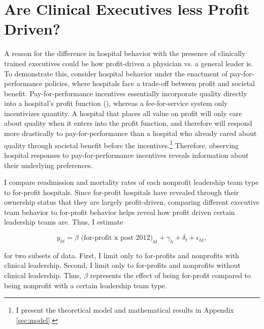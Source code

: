 \documentclass[12pt]{article}
\begin{document}
\begin{figure}
\begin{subfigure}[b]{0.45\textwidth}
         \label{fig:mort_synth_clinical}
     \end{subfigure}
        \label{fig:clinicalsynthdid}
    \end{figure}


    \section{Are Clinical Executives less Profit Driven?}\label{sec:forprofit}

    A reason for the difference in hospital behavior with the presence of clinically trained executives could be how profit-driven a physician vs. a general leader is. To demonstrate this, consider hospital behavior under the enactment of pay-for-performance policies, where hospitals face a trade-off between profit and societal benefit. Pay-for-performance incentives essentially incorporate quality directly into a hospital's profit function (\cite{dranove2011health}), whereas a fee-for-service system only incentivizes quantity. A hospital that places all value on profit will only care about quality when it enters into the profit function, and therefore will respond more drastically to pay-for-performance than a hospital who already cared about quality through societal benefit before the incentives.\footnote{I present the theoretical model and mathematical results in Appendix \ref{sec:model}.} Therefore, observing hospital responses to pay-for-performance incentives reveals information about their underlying preferences.  

    I compare readmission and mortality rates of each nonprofit leadership team type to for-profit hospitals. Since for-profit hospitals have revealed through their ownership status that they are largely profit-driven, comparing different executive team behavior to for-profit behavior helps reveal how profit driven certain leadership teams are. Thus, I estimate

    \begin{equation}
    \label{eq:forprofit}
    y_{ht} = \beta \text{ (for-profit x post 2012)}_{ht} + \gamma_{h} + \delta_t + \epsilon_{ht},
    \end{equation}

    \noindent for two subsets of data. First, I limit only to for-profits and nonprofits with clinical leadership. Second, I limit only to for-profits and nonprofits without clinical leadership. Thus, $\beta$ represents the effect of being for-profit compared to being nonprofit with a certain leadership team type.
\end{document}
